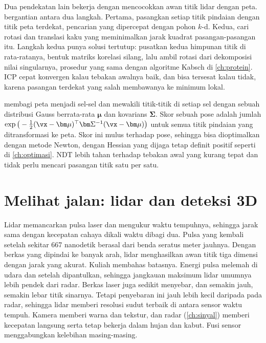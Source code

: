 Dua pendekatan lain bekerja dengan mencocokkan awan titik lidar dengan peta. 
\citep{besl1992} bergantian antara dua langkah. Pertama, pasangkan setiap titik pindaian dengan titik peta terdekat,
pencarian yang dipercepat dengan pohon $k$-d. Kedua, cari rotasi dan translasi kaku yang meminimalkan jarak kuadrat
pasangan-pasangan itu. Langkah kedua punya solusi tertutup: pusatkan kedua himpunan titik di rata-ratanya, bentuk
matriks korelasi silang, lalu ambil rotasi dari dekomposisi nilai singularnya, prosedur yang sama dengan algoritme
Kabsch di \cref{ch:protein}. ICP cepat konvergen kalau tebakan awalnya baik, dan bisa tersesat kalau tidak, karena
pasangan terdekat yang salah membawanya ke minimum lokal.

 \citep{biber2003} membagi peta menjadi sel-sel dan mewakili titik-titik di setiap
sel dengan sebuah distribusi Gauss berrata-rata $\bm\mu$ dan kovarians $\bm\Sigma$. Skor sebuah pose adalah jumlah
$\exp\big(-\tfrac12(\vx-\bm\mu)^\top\bm\Sigma^{-1}(\vx-\bm\mu)\big)$ untuk semua titik pindaian yang ditransformasi ke peta.
Skor ini mulus terhadap pose, sehingga bisa dioptimalkan dengan metode Newton, dengan Hessian yang dijaga tetap definit
positif seperti di \cref{ch:optimasi}. NDT lebih tahan terhadap tebakan awal yang kurang tepat dan tidak perlu mencari
pasangan titik satu per satu.

\section{Melihat jalan: lidar dan deteksi 3D}

Lidar memancarkan pulsa laser dan mengukur waktu tempuhnya, sehingga jarak sama dengan kecepatan cahaya dikali waktu
dibagi dua. Pulsa yang kembali setelah sekitar 667 nanodetik berasal dari benda seratus meter jauhnya. Dengan berkas
yang dipindai ke banyak arah, lidar menghasilkan awan titik tiga dimensi dengan jarak yang akurat. Kuliah
membahas batasnya. Energi pulsa melemah di udara dan setelah dipantulkan, sehingga jangkauan maksimum lidar umumnya
lebih pendek dari radar. Berkas laser juga sedikit menyebar, dan semakin jauh, semakin lebar titik sinarnya. Tetapi
penyebaran ini jauh lebih kecil daripada pada radar, sehingga lidar memberi resolusi sudut terbaik di antara sensor
waktu tempuh. Kamera memberi warna dan tekstur, dan radar (\cref{ch:sinyal}) memberi kecepatan langsung serta tetap
bekerja dalam hujan dan kabut. Fusi sensor menggabungkan kelebihan masing-masing.

